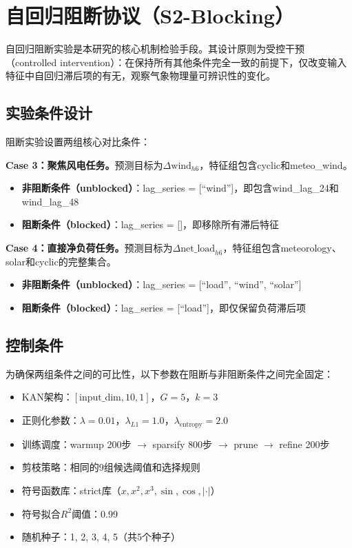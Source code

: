 \section{自回归阻断协议（S2-Blocking）}
\label{sec:blocking-protocol}

自回归阻断实验是本研究的核心机制检验手段。其设计原则为受控干预（controlled intervention）：在保持所有其他条件完全一致的前提下，仅改变输入特征中自回归滞后项的有无，观察气象物理量可辨识性的变化。

\subsection{实验条件设计}

阻断实验设置两组核心对比条件：

\textbf{Case 3：聚焦风电任务。}预测目标为$\Delta\text{wind}_{h6}$，特征组包含cyclic和meteo\_wind。
\begin{itemize}
  \item \textbf{非阻断条件（unblocked）}：lag\_series = [``wind'']，即包含wind\_lag\_24和wind\_lag\_48
  \item \textbf{阻断条件（blocked）}：lag\_series = []，即移除所有滞后特征
\end{itemize}

\textbf{Case 4：直接净负荷任务。}预测目标为$\Delta\text{net\_load}_{h6}$，特征组包含meteorology、solar和cyclic的完整集合。
\begin{itemize}
  \item \textbf{非阻断条件（unblocked）}：lag\_series = [``load'', ``wind'', ``solar'']
  \item \textbf{阻断条件（blocked）}：lag\_series = [``load'']，即仅保留负荷滞后项
\end{itemize}

\subsection{控制条件}

为确保两组条件之间的可比性，以下参数在阻断与非阻断条件之间完全固定：
\begin{itemize}
  \item KAN架构：$[\text{input\_dim}, 10, 1]$，$G=5$，$k=3$
  \item 正则化参数：$\lambda = 0.01$，$\lambda_{L1} = 1.0$，$\lambda_{\text{entropy}} = 2.0$
  \item 训练调度：warmup 200步 $\to$ sparsify 800步 $\to$ prune $\to$ refine 200步
  \item 剪枝策略：相同的9组候选阈值和选择规则
  \item 符号函数库：strict库（$x, x^2, x^3, \sin, \cos, |\cdot|$）
  \item 符号拟合$R^2$阈值：0.99
  \item 随机种子：1, 2, 3, 4, 5（共5个种子）
\end{itemize}

